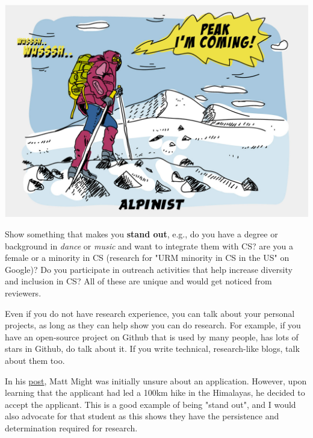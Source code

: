 \documentclass[11pt]{article}
\begin{document}
\begin{center}
    \includegraphics[scale=0.2]{alpinist-climbing-peak-mountain-comic-hand-drawn-vector-illustration.jpg}
  \end{center}


 Show something that makes you \textbf{stand out}, e.g., do you have a degree or background in \emph{dance} or \emph{music} and want to integrate them with CS? are you a female or a minority in CS (research for "URM minority in CS in the US" on Google)? Do you participate in outreach activities that help increase diversity and inclusion in CS? All of these are unique and would get noticed from reviewers. 
    
Even if you do not have research experience, you can talk about your personal projects, as long as they can help show you can do research. For example, if you have an open-source project on Github that is used by many people, has lots of stars in Github, do talk about it. If you write technical, research-like blogs, talk about them too.


In his \href{https://matt.might.net/articles/how-to-apply-and-get-in-to-graduate-school-in-science-mathematics-engineering-or-computer-science/}{post}, Matt Might was initially unsure about an application. However, upon learning that the applicant had led a 100km hike in the Himalayas, he decided to accept the applicant.  This is a good example of being "stand out", and I would also advocate for that student as this shows they have the persistence and determination required for research.


\end{document}

